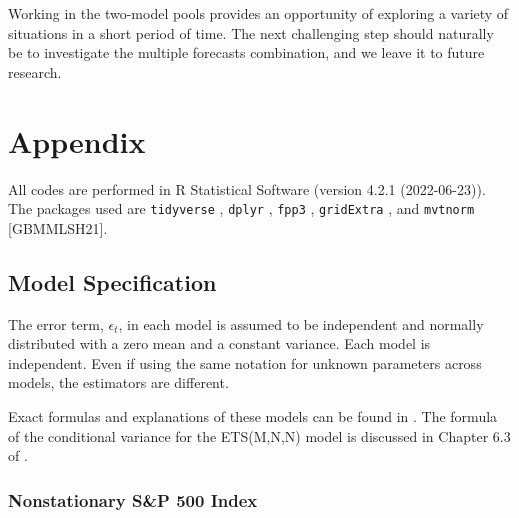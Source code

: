 \documentclass{monashthesis}
\begin{document}
Working in the two-model pools provides an opportunity of exploring a variety of situations in a short period of time. The next challenging step should naturally be to investigate the multiple forecasts combination, and we leave it to future research.

\appendix

\hypertarget{appendix}{%
\chapter{Appendix}\label{appendix}}

All codes are performed in R Statistical Software (version 4.2.1 (2022-06-23)). The packages used are \texttt{tidyverse} \autocite{tidy19}, \texttt{dplyr} \autocite{dplyr23}, \texttt{fpp3} \autocite{fpp23}, \texttt{gridExtra} \autocite{gridExtra}, and \texttt{mvtnorm} {[}GBMMLSH21{]}.

\hypertarget{model-specification}{%
\section{Model Specification}\label{model-specification}}

The error term, \(\epsilon_t\), in each model is assumed to be independent and normally distributed with a zero mean and a constant variance. Each model is independent. Even if using the same notation for unknown parameters across models, the estimators are different.

Exact formulas and explanations of these models can be found in \textcite{fpp3}. The formula of the conditional variance for the ETS(M,N,N) model is discussed in Chapter 6.3 of \textcite{HKOS08}.

\hypertarget{nonstationary-sp-500-index}{%
\subsection{Nonstationary S\&P 500 Index}\label{nonstationary-sp-500-index}}
\end{document}
